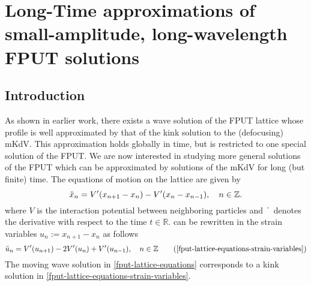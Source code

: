 \chapter{Long-Time approximations of small-amplitude, long-wavelength  FPUT solutions}
\label{chp:long-time-stability}
\pagestyle{myheadings}

\section{Introduction}

As shown in earlier work, there exists a wave solution of the FPUT lattice whose profile is well approximated by that of the kink solution to the (defocusing) mKdV. This approximation holds globally in time, but is restricted to one special solution of the FPUT. We are now interested in studying more general solutions of the FPUT which can be approximated by solutions of the mKdV for long (but finite) time. The equations of motion on the lattice are given by 
\begin{equation}\label{fput-lattice-equations}
	\ddot x_n = V'(x_{n+1} - x_n) - V'(x_n - x_{n-1}), \quad n \in \mathbb{Z}.
\end{equation}
where \(V\) is the interaction potential between neighboring particles and \(\dot{\hspace{0.5em}}\) denotes the derivative with respect to the time \(t\in \mathbb{R}\).  can be rewritten in the strain variables \(u_n := x_{n+1} - x_n\) as follows
\begin{equation*}\label{fput-lattice-equations-strain-variables}
	\ddot{u}_n = V'(u_{n+1}) - 2 V'(u_n) + V'(u_{n-1}), \quad n \in \Z \tag{\ref{fput-lattice-equations-strain-variables}}
\end{equation*}
The moving wave solution in \cref{fput-lattice-equations} corresponds to a kink solution in \cref{fput-lattice-equations-strain-variables}.

